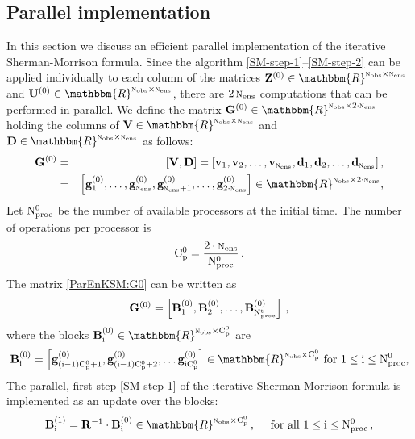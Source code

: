 \documentclass[12pt]{article}
\newcommand{\Nobs}{\textsc{n}_{{\rm obs}}}
\newcommand{\Nens}{\textsc{n}_{{\rm ens}}}
\newcommand{\Nproc}[1]{{\rm N_{proc}^{\rm #1}}}
\newcommand{\nc}[1]{{\rm C_{p}^{\rm #1}}}
\newcommand{\R}{{\bf R}}
\newcommand{\sZ}[1]{{\bf Z}^{\left(\rm #1 \right)}}
\newcommand{\U}[1]{{\bf U}^{\left ( \rm #1 \right)}}
\newcommand{\D}{{\bf D}}
\renewcommand{\d}[1]{{\bf d}_{\rm #1}}
\newcommand{\V}{{\bf V}}
\renewcommand{\v}[1]{{\bf v}_{{\rm #1}}}
\renewcommand{\Re}{\mathbbm{R}}
\newcommand{\G}[1]{\bf G^{(\rm #1)}}
\newcommand{\gj}[2]{\bf {g_{\rm #1}^{(\rm #2)}}}
\newcommand{\invS}[1]{ {#1^{-1}}}
\newcommand{\Bi}[2]{{\bf B_{\rm #1}^{\rm ( #2 )}}}
\begin{document}
\subsection{Parallel implementation}
\label{parallelimpl}


In this section we discuss an efficient parallel implementation of the iterative Sherman-Morrison formula. Since the algorithm \eqref{SM-step-1}--\eqref{SM-step-2} can be applied individually to each column of the matrices $\sZ{0} \in \Re^{\Nobs \times \Nens}$ and $\U{0} \in \Re^{\Nobs \times \Nens}$, there are $2\,\Nens$ computations that can be performed in parallel. We define the matrix ${\G{0}} \in \Re^{\Nobs \times 2\cdot \Nens}$ holding the columns of $\V \in \Re^{\Nobs \times \Nens}$ and $\D \in \Re^{\Nobs \times \Nens}$ as follows:
\begin{eqnarray}
\label{ParEnKSM:G0}
\displaystyle \G{0} &=& \left[ \V, \D\right] = \left [ \v{1},\v{2}, \ldots,  \v{\Nens} , \d{1}, \d{2},  \ldots, \d{\Nens} \right ], \\ \nonumber
  &=& \left [\gj{1}{0}, \ldots, \gj{\Nens}{0},  \gj{\Nens+1}{0}, \ldots,\gj{2 \cdot \Nens}{0} \right ] \in \Re^{\Nobs \times 2 \cdot \Nens}, 
\end{eqnarray}
Let $\Nproc{0}$ be the number of available processors at the initial time. The number of operations per processor is 
\begin{eqnarray} \nonumber
\label{EnKSM:assigned-process}
\displaystyle \nc{0} = \frac{2 \cdot \Nens}{\Nproc{0}}\,.
\end{eqnarray}
The matrix \eqref{ParEnKSM:G0}  can be written as 
\begin{eqnarray} \nonumber
\label{EnKSM:block-definition-initial-G}
\displaystyle 
{\G{0}} = \left [ \Bi{1}{0}, \Bi{2}{0}, \ldots , \Bi{\Nproc{t}}{0}\right ] \,,
\end{eqnarray}
where the blocks $\Bi{i}{0} \in \Re^{\Nobs \times \nc{0}}$ are 
\begin{eqnarray} \nonumber
\displaystyle 
\Bi{i}{0} = \left[ \gj{(i-1)\nc{0}+1}{0}, \gj{(i-1)\nc{0}+2}{0}, \ldots \gj{i\nc{0}}{0} \right ] \in \Re^{\Nobs \times \nc{0}} \text{ for  $1 \le {\rm i} \le \Nproc{0}$},
\end{eqnarray}
The parallel, first step \eqref{SM-step-1} of the iterative Sherman-Morrison formula is implemented as an update over the blocks:
\begin{eqnarray} \nonumber
\displaystyle 
\Bi{i}{1} = \invS{\R} \cdot \Bi{i}{0} \in \Re^{\Nobs \times \nc{0}}\,,\quad \text{ for all $1 \le {\rm i} \le \Nproc{0}$} \,,
\end{eqnarray}
\end{document}
